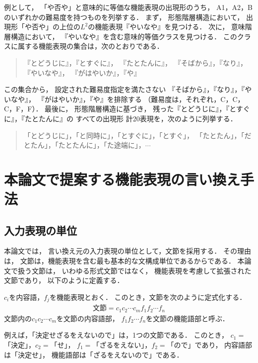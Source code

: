 \documentclass[japanese]{jnlp_1.4}
\begin{document}
例として，
「や否や」と意味的に等価な機能表現の出現形のうち，
A1，A2，Bのいずれかの難易度を持つものを列挙する．
まず，
形態階層構造において，
出現形「や否や」の上位の$L^2$の機能表現『やいなや』を見つける．
次に，
意味階層構造において，
『やいなや』を含む意味的等価クラスを見つける．
このクラスに属する機能表現の集合は，次のとおりである．
\begin{quote}
『とどうじに』，『とすぐに』，
『たとたんに』，
『そばから』，『なり』，『やいなや』，
『がはやいか』，『や』
\end{quote}
この集合から，
設定された難易度指定を満たさない
『そばから』，『なり』，『やいなや』，
『がはやいか』，『や』を排除する
（難易度は，それぞれ，C，C，C，F，F）．
最後に，
形態階層構造に基づき，
残った『とどうじに』，『とすぐに』，『たとたんに』の
すべての出現形 計20表現を，次のように列挙する．
\begin{quote}
「とどうじに」，「と同時に」，「とすぐに」，「とすぐ」，
「たとたん」，「だとたん」，「たとたんに」，「た途端に」，$\cdots$
\end{quote}




\section{本論文で提案する機能表現の言い換え手法}
\label{sec:formulation}


\subsection{入力表現の単位}
\label{subsec:unit}

本論文では，
言い換え元の入力表現の単位として，文節を採用する．
その理由は，
文節は，機能表現を含む最も基本的な文構成単位であるからである．
本論文で扱う文節は，
いわゆる形式文節ではなく，
機能表現を考慮して拡張された文節であり，
以下のように定義する．

$c_i$を内容語，$f_j$を機能表現とおく．
このとき，文節を次のように定式化する．
\begin{eqnarray}
\mbox{文節} = c_1 c_2 \cdots c_m f_1 f_2 \cdots f_n 
\label{eq:phrase}
\end{eqnarray}
文節内の$c_1 c_2 \cdots c_m$を文節の内容語部，
$f_1 f_2 \cdots f_n$を文節の機能語部と呼ぶ．

例えば，「決定せざるをえないので」は，1つの文節である．
このとき，
$c_1 =$「決定」，$c_2 =$「せ」，
$f_1 =$「ざるをえない」，$f_2 =$「ので」であり，
内容語部は「決定せ」，
機能語部は「ざるをえないので」である．
\end{document}
